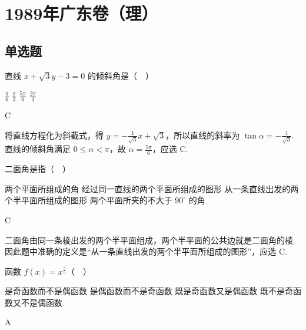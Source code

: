 \documentclass[UTF8,a4paper,oneside,11pt]{ctexbook}
\begin{document}
\mainmatter

\chapter{1989年广东卷（理）}

\section{单选题}

\begin{problem}
直线 \(x+\sqrt{3}y-3=0\) 的倾斜角是（\(\quad\)）

\choices
    {\(\frac{\pi}{6}\)}
    {\(\frac{\pi}{3}\)}
    {\(\frac{5\pi}{6}\)}
    {\(\frac{2\pi}{3}\)}
\end{problem}

\begin{answer}
C
\end{answer}

\begin{solution}
将直线方程化为斜截式，得
\(y=-\frac{1}{\sqrt{3}}x+\sqrt{3}\)，所以直线的斜率为 \(\tan\alpha=-\frac{1}{\sqrt{3}}\). 直线的倾斜角满足 \(0\leqslant\alpha<\pi\)，故 \(\alpha=\frac{5\pi}{6}\)，应选 C.
\end{solution}

\begin{problem}
二面角是指（\(\quad\)）

\choices
    {两个平面所组成的角}
    {经过同一直线的两个平面所组成的图形}
    {从一条直线出发的两个半平面所组成的图形}
    {两个平面所夹的不大于 \(90^\circ\) 的角}
\end{problem}

\begin{answer}
C
\end{answer}

\begin{solution}
二面角由同一条棱出发的两个半平面组成，两个半平面的公共边就是二面角的棱. 因此题中准确的定义是“从一条直线出发的两个半平面所组成的图形”，应选 C.
\end{solution}

\begin{problem}
函数 \(f(x)=x^{\frac{3}{5}}\)（\(\quad\)）

\choices
    {是奇函数而不是偶函数}
    {是偶函数而不是奇函数}
    {既是奇函数又是偶函数}
    {既不是奇函数又不是偶函数}
\end{problem}

\begin{answer}
A
\end{answer}
\end{document}
